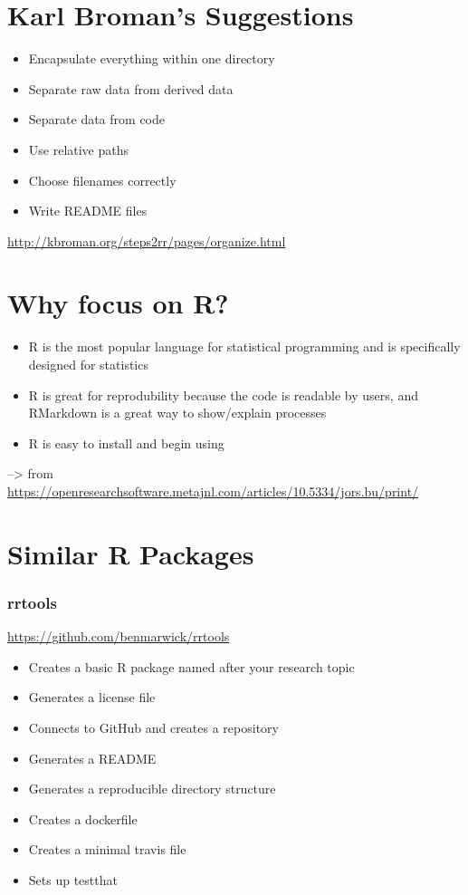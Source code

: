 \documentclass[12pt]{article}
\providecommand{\tightlist}{%
  \setlength{\itemsep}{0pt}\setlength{\parskip}{0pt}}
\begin{document}
\citet{cooper2017guide}

\section{Karl Broman's Suggestions}\label{karl-bromans-suggestions}

\begin{itemize}
\tightlist
\item
  Encapsulate everything within one directory
\item
  Separate raw data from derived data
\item
  Separate data from code
\item
  Use relative paths
\item
  Choose filenames correctly
\item
  Write README files
\end{itemize}

\url{http://kbroman.org/steps2rr/pages/organize.html}

\section{Why focus on R?}\label{why-focus-on-r}

\begin{itemize}
\tightlist
\item
  R is the most popular language for statistical programming and is
  specifically designed for statistics
\item
  R is great for reprodubility because the code is readable by users,
  and RMarkdown is a great way to show/explain processes
\item
  R is easy to install and begin using
\end{itemize}

--\textgreater{} from
\url{https://openresearchsoftware.metajnl.com/articles/10.5334/jors.bu/print/}

\section{Similar R Packages}\label{similar-r-packages}

\subsubsection{rrtools}\label{rrtools}

\url{https://github.com/benmarwick/rrtools}

\begin{itemize}
\tightlist
\item
  Creates a basic R package named after your research topic
\item
  Generates a license file
\item
  Connects to GitHub and creates a repository
\item
  Generates a README
\item
  Generates a reproducible directory structure
\item
  Creates a dockerfile
\item
  Creates a minimal travis file
\item
  Sets up testthat
\end{itemize}
\end{document}
